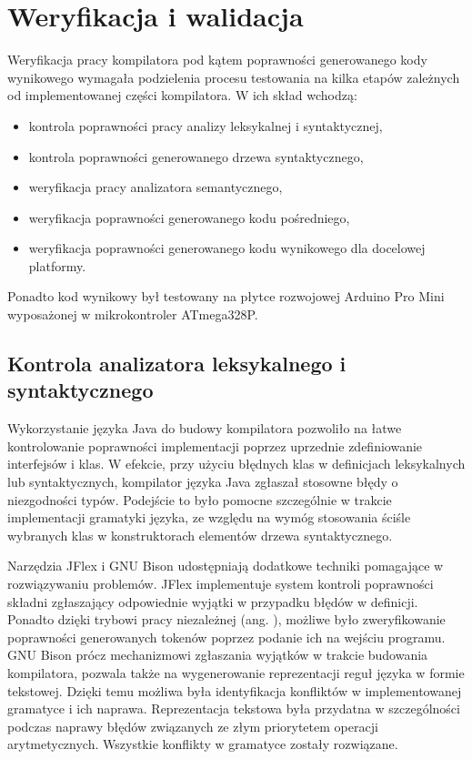 \chapter{Weryfikacja i walidacja}
\label{ch:06}
Weryfikacja pracy kompilatora pod kątem poprawności generowanego kody wynikowego wymagała podzielenia procesu testowania na kilka etapów zależnych od implementowanej części kompilatora. W ich skład wchodzą:
\begin{itemize}
\item kontrola poprawności pracy analizy leksykalnej i syntaktycznej,
\item kontrola poprawności generowanego drzewa syntaktycznego,
\item weryfikacja pracy analizatora semantycznego,
\item weryfikacja poprawności generowanego kodu pośredniego,
\item weryfikacja poprawności generowanego kodu wynikowego dla docelowej platformy.
\end{itemize}
Ponadto kod wynikowy był testowany na płytce rozwojowej Arduino Pro Mini wyposażonej w mikrokontroler ATmega328P.

\section{Kontrola analizatora leksykalnego i syntaktycznego}
Wykorzystanie języka Java do budowy kompilatora pozwoliło na łatwe kontrolowanie poprawności implementacji poprzez uprzednie zdefiniowanie interfejsów i klas. W efekcie, przy użyciu błędnych klas w definicjach leksykalnych lub syntaktycznych, kompilator języka Java zgłaszał stosowne błędy o niezgodności typów. Podejście to było pomocne szczególnie w trakcie implementacji gramatyki języka, ze względu na wymóg stosowania ściśle wybranych klas w konstruktorach elementów drzewa syntaktycznego.

Narzędzia JFlex i GNU Bison udostępniają dodatkowe techniki pomagające w rozwiązywaniu problemów. JFlex implementuje system kontroli poprawności składni zgłaszający odpowiednie wyjątki w przypadku błędów w definicji. Ponadto dzięki trybowi pracy niezależnej (ang. ), możliwe było zweryfikowanie poprawności generowanych tokenów poprzez podanie ich na wejściu programu.
GNU Bison prócz mechanizmowi zgłaszania wyjątków w trakcie budowania kompilatora, pozwala także na wygenerowanie reprezentacji reguł języka w formie tekstowej. Dzięki temu możliwa była identyfikacja konfliktów w implementowanej gramatyce i ich naprawa. Reprezentacja tekstowa była przydatna w szczególności podczas naprawy błędów związanych ze złym priorytetem operacji arytmetycznych. Wszystkie konflikty w gramatyce zostały rozwiązane.

